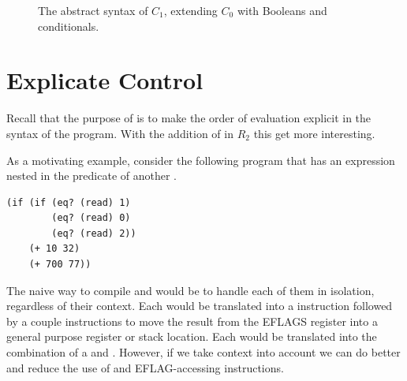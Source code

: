 \documentclass[11pt]{book}
\newcommand{\gray}[1]{{\color{lightgray} #1}}
\begin{document}
\begin{figure}[tp]
\fbox{
\begin{minipage}{0.96\textwidth}
\small    
\[
\begin{array}{lcl}
\Atm &::=& \gray{\INT{\Int} \mid \VAR{\Var}} \mid \BOOL{\itm{bool}} \\
\itm{cmp} &::= & \key{eq?} \mid \key{<}  \\
\Exp &::= & \gray{ \Atm \mid \READ{} }\\
     &\mid& \gray{ \NEG{\Atm} \mid \ADD{\Atm}{\Atm} } \\
     &\mid& \UNIOP{\key{'not}}{\Atm} 
     \mid \BINOP{\key{'}\itm{cmp}}{\Atm}{\Atm} \\
\Stmt &::=& \gray{ \ASSIGN{\VAR{\Var}}{\Exp} } \\
\Tail &::= & \gray{\RETURN{\Exp} \mid \SEQ{\Stmt}{\Tail} } \\
    &\mid& \GOTO{\itm{label}} \\
    &\mid& \IFSTMT{\BINOP{\itm{cmp}}{\Atm}{\Atm}}{\GOTO{\itm{label}}}{\GOTO{\itm{label}}} \\
C_1 & ::= & \gray{\PROGRAM{\itm{info}}{\CFG{\key{(}\itm{label}\,\key{.}\,\Tail\key{)}^{+}}}}
\end{array}
\]
\end{minipage}
}
\caption{The abstract syntax of $C_1$, extending $C_0$ with Booleans and conditionals.}
\label{fig:c1-syntax}
\end{figure}


\section{Explicate Control}
\label{sec:explicate-control-r2}

Recall that the purpose of  is to make the
order of evaluation explicit in the syntax of the program.  With the
addition of  in $R_2$ this get more interesting.

As a motivating example, consider the following program that has an
 expression nested in the predicate of another .
\begin{center}
\begin{minipage}{0.96\textwidth}
\begin{lstlisting}
(if (if (eq? (read) 1)
        (eq? (read) 0)
        (eq? (read) 2))
    (+ 10 32)
    (+ 700 77))
\end{lstlisting}
\end{minipage}
\end{center}
%
The naive way to compile  and  would be to handle
each of them in isolation, regardless of their context.  Each
 would be translated into a  instruction followed
by a couple instructions to move the result from the EFLAGS register
into a general purpose register or stack location. Each  would
be translated into the combination of a  and .
However, if we take context into account we can do better and reduce
the use of  and EFLAG-accessing instructions.
\end{document}
